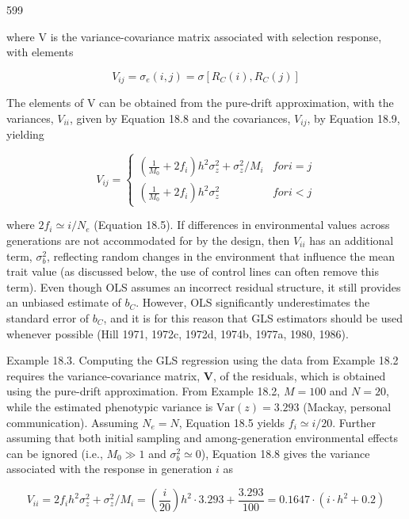 \documentclass{article}
\begin{document}
599

where V is the variance-covariance matrix associated with selection response, with elements

\begin{equation}
V_{i j}=\sigma_{e}(i,j)=\sigma\left[R_{C}(i),R_{C}(j)\right]
\tag{18.15b}
\label{eq:18_15b}
\end{equation}

The elements of V can be obtained from the pure-drift approximation, with the variances,  $ V_{ii} $, given by Equation 18.8 and the covariances,  $ V_{ij} $, by Equation 18.9, yielding

\begin{equation}
V_{ij}=\left\{\begin{array}{ll}\left(\frac{1}{M_{0}}+2f_{i}\right)h^{2}\sigma_{z}^{2}+\sigma_{z}^{2}/M_{i}&for i=j\\\left(\frac{1}{M_{0}}+2f_{i}\right)h^{2}\sigma_{z}^{2}&for i<j\end{array}\right.
\tag{18.15c}
\label{eq:18_15c}
\end{equation}

where  $ 2f_i \simeq i/N_e $ (Equation 18.5). If differences in environmental values across generations are not accommodated for by the design, then  $ V_{ii} $ has an additional term,  $ \sigma_b^2 $, reflecting random changes in the environment that influence the mean trait value (as discussed below, the use of control lines can often remove this term). Even though OLS assumes an incorrect residual structure, it still provides an unbiased estimate of  $ b_C $. However, OLS significantly underestimates the standard error of  $ b_C $, and it is for this reason that GLS estimators should be used whenever possible (Hill 1971, 1972c, 1972d, 1974b, 1977a, 1980, 1986).

Example 18.3. Computing the GLS regression using the data from Example 18.2 requires the variance-covariance matrix,  $ \mathbf{V} $, of the residuals, which is obtained using the pure-drift approximation. From Example 18.2,  $ M = 100 $ and  $ N = 20 $, while the estimated phenotypic variance is  $ \text{Var}(z) = 3.293 $ (Mackay, personal communication). Assuming  $ N_e = N $, Equation 18.5 yields  $ f_i \simeq i/20 $. Further assuming that both initial sampling and among-generation environmental effects can be ignored (i.e.,  $ M_0 \gg 1 $ and  $ \sigma_b^2 \simeq 0 $), Equation 18.8 gives the variance associated with the response in generation  $ i $ as

\begin{equation}
V_{ii}=2f_{i}h^{2}\sigma_{z}^{2}+\sigma_{z}^{2}/M_{i}=\left(\frac{i}{20}\right)h^{2}\cdot3.293+\frac{3.293}{100}=0.1647\cdot(i\cdot h^{2}+0.2)
\end{equation}
\end{document}
